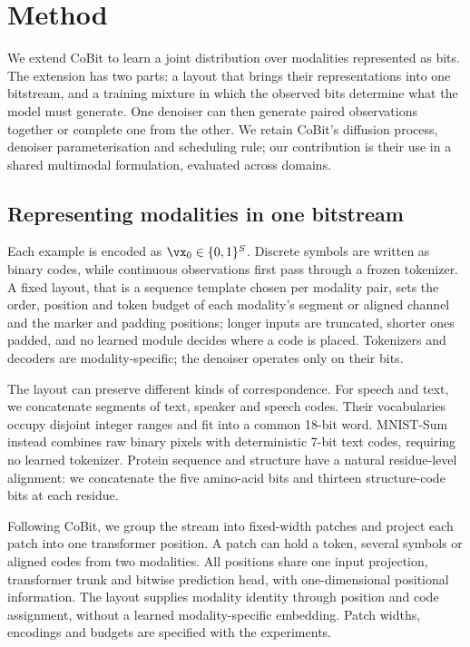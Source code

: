 \section{Method}
\label{sec:method}

We extend CoBit \citep{method:cobit} to learn a joint distribution over modalities represented
as bits. The extension has two parts: a layout that brings their representations into one
bitstream, and a training mixture in which the observed bits determine what the model must
generate. One denoiser can then generate paired observations together or complete one from the
other. We retain CoBit's diffusion process, denoiser parameterisation and scheduling rule;
our contribution is their use in a shared multimodal formulation, evaluated across domains.

\subsection{Representing modalities in one bitstream}
\label{sec:method:multimodal}

Each example is encoded as $\vx_0\in\{0,1\}^{S}$. Discrete symbols are written as binary
codes, while continuous observations first pass through a frozen tokenizer. A fixed layout, that is a sequence template chosen per modality pair, sets the order, position and token budget of each modality's segment or aligned channel and the marker and padding positions; longer inputs are truncated, shorter ones padded, and no learned module decides where a code is placed. Tokenizers and decoders are modality-specific; the denoiser operates only on their bits.

The layout can preserve different kinds of correspondence. For speech and text, we concatenate
segments of text, speaker and speech codes. Their vocabularies occupy disjoint integer ranges
and fit into a common 18-bit word. MNIST-Sum instead combines raw binary pixels with deterministic
7-bit text codes, requiring no learned tokenizer. Protein sequence and structure have a natural
residue-level alignment: we concatenate the five amino-acid bits and thirteen structure-code
bits at each residue.

Following CoBit, we group the stream into fixed-width patches and project each patch into one
transformer position. A patch can hold a token, several symbols or aligned codes from two
modalities. All positions share one input projection, transformer trunk and bitwise prediction
head, with one-dimensional positional information. The layout supplies modality identity through
position and code assignment, without a learned modality-specific embedding. Patch widths,
encodings and budgets are specified with the experiments.

